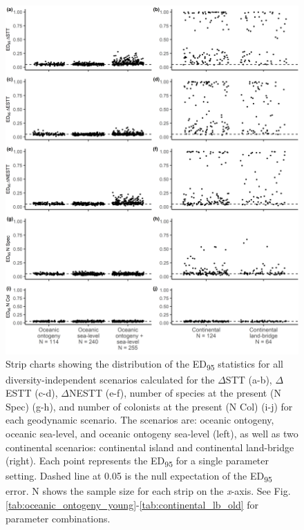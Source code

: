 \begin{figure}
    \centering
    \includegraphics[width=\textwidth]{facet_scenario_di.png}
    \caption{Strip charts showing the distribution of the ED\textsubscript{95} statistics for all diversity-independent scenarios calculated for the $\Delta$STT (a-b), $\Delta$ESTT (c-d), $\Delta$NESTT (e-f), number of species at the present (N Spec) (g-h), and number of colonists at the present (N Col) (i-j) for each geodynamic scenario. The scenarios are: oceanic ontogeny, oceanic sea-level, and oceanic ontogeny sea-level (left), as well as two continental scenarios: continental island and continental land-bridge (right). Each point represents the ED\textsubscript{95} for a single parameter setting. Dashed line at 0.05 is the null expectation of the ED\textsubscript{95} error. N shows the sample size for each strip on the \textit{x}-axis. See Fig. \ref{tab:oceanic_ontogeny_young}-\ref{tab:continental_lb_old} for parameter combinations.}
    \label{fig:facet_scenario_di}
\end{figure}

